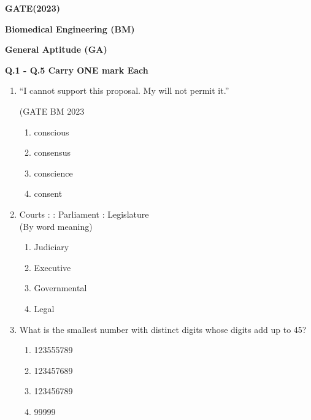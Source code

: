 \documentclass[journal]{IEEEtran}
\begin{document}

\begin{center}
    \textbf{\Large GATE(2023)}
    
    \textbf{Biomedical Engineering (BM)}
    
    \vspace{0.5cm}
    \textbf{General Aptitude (GA)}
    \end{center}

    \textbf{Q.1 - Q.5 Carry ONE mark Each}

\begin{enumerate}
   
 \item \quad ``I cannot support this proposal. My \underline{\hspace{3cm}} will not permit it.''
 
\hfill (GATE BM 2023

\begin{enumerate}
    \item conscious
    \item consensus
    \item conscience
    \item consent
    
\end{enumerate}


\item  \quad Courts : \underline{\hspace{2cm}} : Parliament : Legislature\\
(By word meaning)

\hfill{}

\begin{enumerate}
    \item Judiciary
    \item Executive
    \item Governmental
    \item Legal
\end{enumerate}


 \item What is the smallest number with distinct digits whose digits add up to 45?

\hfill{}

\begin{enumerate}
    \item 123555789
    \item 123457689
    \item 123456789
    \item 99999
\end{enumerate}



\end{enumerate}
\end{document}
